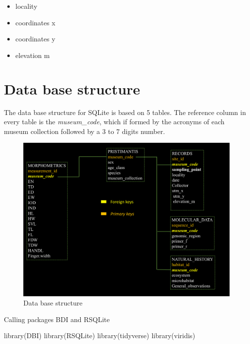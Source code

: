 \documentclass[
]{book}
\newenvironment{Shaded}{\begin{snugshade}}{\end{snugshade}}
\newcommand{\FunctionTok}[1]{\textcolor[rgb]{0.00,0.00,0.00}{#1}}
\newcommand{\NormalTok}[1]{#1}
\providecommand{\tightlist}{%
  \setlength{\itemsep}{0pt}\setlength{\parskip}{0pt}}
\begin{document}
\begin{enumerate}
  \begin{itemize}
  \tightlist
  \item
    locality
  \item
    coordinates x
  \item
    coordinates y
  \item
    elevation m
  \end{itemize}
\end{enumerate}

\hypertarget{data-base-structure}{%
\section{Data base structure}\label{data-base-structure}}

The data base structure for SQLite is based on 5 tables. The reference column in every table is the \emph{museum\_code}, which if formed by the acronyms of each museum collection followed by a 3 to 7 digits number.

\begin{figure}

{\centering \includegraphics[width=21.64in,height=2\textheight]{figure2} 

}

\caption{Data base structure}\label{fig:plot2}
\end{figure}

Calling packages BDI and RSQLite

\begin{Shaded}
\begin{Highlighting}[]
\FunctionTok{library}\NormalTok{(DBI)}
\FunctionTok{library}\NormalTok{(RSQLite)}
\FunctionTok{library}\NormalTok{(tidyverse)}
\FunctionTok{library}\NormalTok{(viridis)}
\end{Highlighting}
\end{Shaded}
\end{document}
